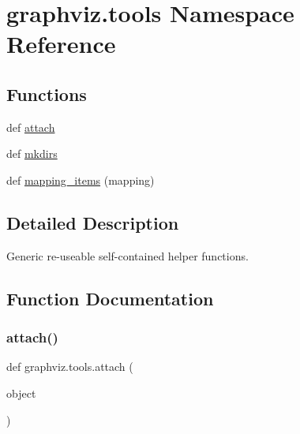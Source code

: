 \hypertarget{namespacegraphviz_1_1tools}{}\section{graphviz.\+tools Namespace Reference}
\label{namespacegraphviz_1_1tools}
\subsection*{Functions}
\begin{DoxyCompactItemize}
\item 
def \hyperlink{namespacegraphviz_1_1tools_aaef6b2c64d0f4a8fb899dfe5648d3d10}{attach}
\item 
def \hyperlink{namespacegraphviz_1_1tools_af1a59f0a7eb40eb2ec66666aedcf9183}{mkdirs}
\item 
def \hyperlink{namespacegraphviz_1_1tools_aa562d6dcc043feb04b1b072b30350f57}{mapping\+\_\+items} (mapping)
\end{DoxyCompactItemize}


\subsection{Detailed Description}
\begin{DoxyVerb}Generic re-useable self-contained helper functions.\end{DoxyVerb}
 

\subsection{Function Documentation}
\mbox{\label{namespacegraphviz_1_1tools_aaef6b2c64d0f4a8fb899dfe5648d3d10}} 
\subsubsection{\texorpdfstring{attach()}{attach()}}
{\footnotesize\ttfamily def graphviz.\+tools.\+attach (\begin{DoxyParamCaption}\item[{}]{object }\end{DoxyParamCaption})}

\mbox{\label{namespacegraphviz_1_1tools_aa562d6dcc043feb04b1b072b30350f57}} 
